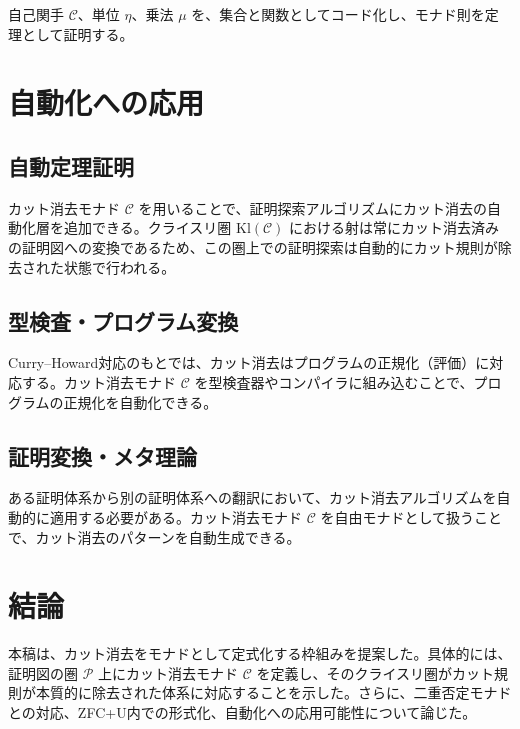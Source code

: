 \documentclass[11pt,a4paper]{article}
\theoremstyle{definition}
\newcommand{\monad}{\mathcal{C}}
\newcommand{\proofs}{\mathcal{P}}
\newcommand{\kleisli}{\mathrm{Kl}}
\begin{document}
自己関手 $\monad$、単位 $\eta$、乗法 $\mu$ を、集合と関数としてコード化し、モナド則を定理として証明する。

\section{自動化への応用}

\subsection{自動定理証明}

カット消去モナド $\monad$ を用いることで、証明探索アルゴリズムにカット消去の自動化層を追加できる。クライスリ圏 $\kleisli(\monad)$ における射は常にカット消去済みの証明図への変換であるため、この圏上での証明探索は自動的にカット規則が除去された状態で行われる。

\subsection{型検査・プログラム変換}

Curry–Howard対応のもとでは、カット消去はプログラムの正規化（評価）に対応する。カット消去モナド $\monad$ を型検査器やコンパイラに組み込むことで、プログラムの正規化を自動化できる。

\subsection{証明変換・メタ理論}

ある証明体系から別の証明体系への翻訳において、カット消去アルゴリズムを自動的に適用する必要がある。カット消去モナド $\monad$ を自由モナドとして扱うことで、カット消去のパターンを自動生成できる。

\section{結論}

本稿は、カット消去をモナドとして定式化する枠組みを提案した。具体的には、証明図の圏 $\proofs$ 上にカット消去モナド $\monad$ を定義し、そのクライスリ圏がカット規則が本質的に除去された体系に対応することを示した。さらに、二重否定モナドとの対応、ZFC+U内での形式化、自動化への応用可能性について論じた。
\end{document}
